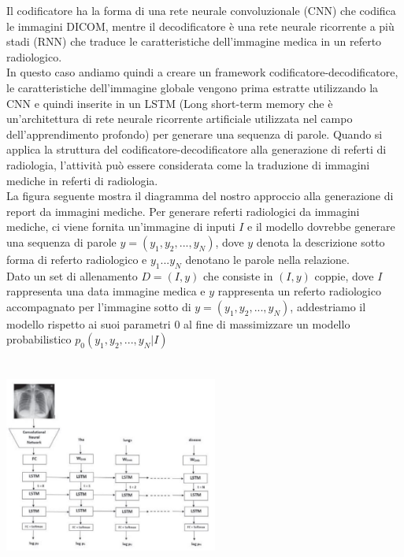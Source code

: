 \documentclass[12pt,a4paper]{report}
\begin{document}
Il codificatore ha la forma di una rete neurale convoluzionale (CNN) che codifica le immagini DICOM, mentre il decodificatore è una rete neurale ricorrente a più stadi (RNN) che traduce le caratteristiche dell'immagine medica in un referto radiologico.\\
In questo caso andiamo quindi a creare un framework codificatore-decodificatore, le caratteristiche dell'immagine globale vengono prima estratte utilizzando la CNN e quindi inserite in un LSTM (Long short-term memory che è un'architettura di rete neurale ricorrente artificiale utilizzata nel campo dell'apprendimento profondo) per generare una sequenza di parole. Quando si applica la struttura del codificatore-decodificatore alla generazione di referti di radiologia, l'attività può essere considerata come la traduzione di immagini mediche in referti di radiologia.\\
La figura seguente mostra il diagramma del nostro approccio alla generazione di report da immagini mediche. Per generare referti radiologici da immagini mediche, ci viene fornita un'immagine di inputi $I$ e il modello dovrebbe generare una sequenza di parole $y = (y_1, y_2, . . . ,y_N)$, dove $y$ denota la descrizione sotto forma di referto radiologico e $y_1 . . .y_N$ denotano le parole nella relazione.\\
Dato un set di allenamento $D = (I, y)$ che consiste in $(I, y)$ coppie, dove $I$ rappresenta una data immagine medica e $y$ rappresenta un referto radiologico accompagnato per l'immagine sotto di $y = (y_1, y_2, . . . ,y_N)$, addestriamo il modello rispetto ai suoi parametri 0 al fine di massimizzare un modello probabilistico $p_0(y_1, y_2, . . . , y_N|I)$

\begin{center}
\includegraphics[width=7cm,height=7cm,keepaspectratio]{LSTM}
\end{center}
\end{document}
